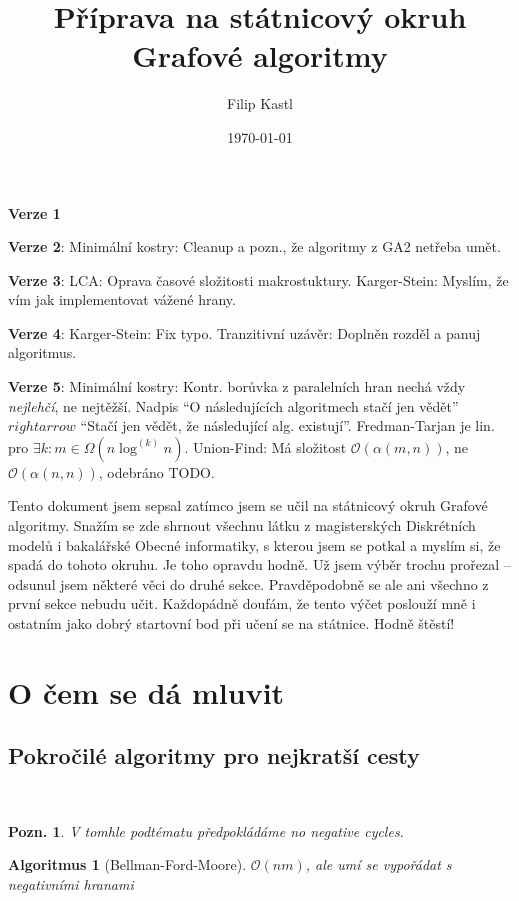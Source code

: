 \documentclass{article}
\title{Příprava na státnicový okruh Grafové algoritmy}
\author{Filip Kastl}
\date{\today}
\theoremstyle{noparens}
\newtheorem*{alg}{Algoritmus}
\theoremstyle{noparens-mys}
\theoremstyle{noparens-note}
\newtheorem*{note}{Pozn.}
\newcommand{\OO}{\mathcal{O}}
\begin{document}
\maketitle

\noindent
\textbf{Verze 1}

\noindent
\textbf{Verze 2}: Minimální kostry: Cleanup a pozn., že algoritmy z GA2
netřeba umět.

\noindent
\textbf{Verze 3}: LCA: Oprava časové složitosti makrostuktury.
Karger-Stein: Myslím, že vím jak implementovat vážené hrany.

\noindent
\textbf{Verze 4}: Karger-Stein: Fix typo. Tranzitivní uzávěr: Doplněn rozděl a
panuj algoritmus.

\noindent
\textbf{Verze 5}: Minimální kostry: Kontr. borůvka z paralelních hran nechá
vždy \emph{nejlehčí}, ne nejtěžší. Nadpis \enquote{O následujících algoritmech
stačí jen vědět} $rightarrow$ \enquote{Stačí jen vědět, že následující alg.
existují}. Fredman-Tarjan je lin. pro $\exists k: m \in \Omega(n \log^{(k)}
n)$. Union-Find: Má složitost $\OO(\alpha(m, n))$, ne $\OO(\alpha(n, n))$,
odebráno TODO.

Tento dokument jsem sepsal zatímco jsem se učil na státnicový okruh Grafové
algoritmy.  Snažím se zde shrnout všechnu látku z magisterských Diskrétních
modelů i bakalářské Obecné informatiky, s kterou jsem se potkal a myslím si, že
spadá do tohoto okruhu.  Je toho opravdu hodně.  Už jsem výběr trochu prořezal
-- odsunul jsem některé věci do druhé sekce.  Pravděpodobně se ale ani všechno
z první sekce nebudu učit.  Každopádně doufám, že tento výčet poslouží mně i
ostatním jako dobrý startovní bod při učení se na státnice.  Hodně štěstí!

\section{O čem se dá mluvit}

\subsection{Pokročilé algoritmy pro nejkratší cesty}

~

\begin{note}
	V tomhle podtématu předpokládáme no negative cycles.
\end{note}

\begin{alg}[Bellman-Ford-Moore]
	$\OO(nm)$, ale umí se vypořádat s negativními hranami
\end{alg}
\end{document}
